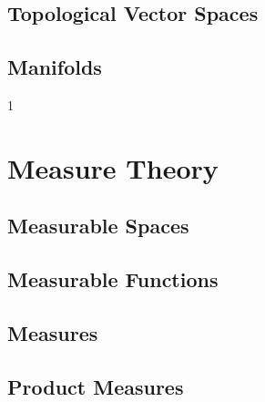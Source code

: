 \documentclass{book}                                                           %
\def\compileanalysis{0}
\begin{document}
                \chapter{Topological Vector Spaces}
                \chapter{Manifolds}
        \clearpage
        \setcounter{endpage}{\thepage}
    \fi

    \if\compileanalysis1
            \renewcommand{\TOPPATH}{books/Analysis}
            \label{book:Analysis}%
            \setcounter{page}{\value{endpage}}
            \part{Measure Theory}
                \renewcommand{\PARPATH}{\TOPPATH/Measure_Theory}
                \chapter{Measurable Spaces}
                    \renewcommand{\PATH}{\PARPATH/Measurable_Spaces}
                    
                    
                    
                    
                    
                    
                \chapter{Measurable Functions}
                    \renewcommand{\PATH}{\PARPATH/Measurable_Functions}
                    
                    
                \chapter{Measures}
                    \renewcommand{\PATH}{\PARPATH/Measures}
                    
                    
                \chapter{Product Measures}
                    \renewcommand{\PATH}{\PARPATH/Product_Measures}
                    
\end{document}
